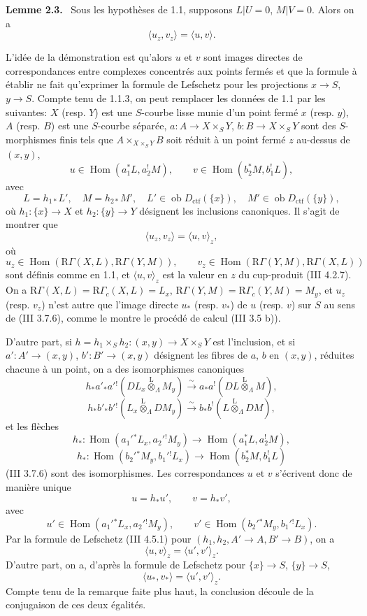 \documentclass[11pt]{article}
\newenvironment{statement}[1]{\par\medskip\noindent\textbf{#1.}\ }{\par\medskip}
\DeclareMathOperator{\Hom}{Hom}
\providecommand{\lten}{\overset{\mathrm L}{\otimes}}
\providecommand{\Ob}{\operatorname{ob}}
\providecommand{\Hom}{\operatorname{Hom}}
\providecommand{\lten}{\overset{\mathrm L}{\otimes}}
\providecommand{\lten}{\overset{\mathrm L}{\otimes}}
\providecommand{\Ob}{\operatorname{ob}}
\providecommand{\lten}{\overset{\mathrm L}{\otimes}}
\providecommand{\lten}{\overset{\mathrm L}{\otimes}}
\providecommand{\Ob}{\operatorname{Ob}}
\providecommand{\lten}{\overset{\mathrm L}{\otimes}}
\begin{document}
\begin{statement}{Lemme 2.3}
Sous les hypothèses de 1.1, supposons $L|U=0$, $M|V=0$. Alors on a
\[
\langle u_z,v_z\rangle=\langle u,v\rangle .
\]
\end{statement}

L'idée de la démonstration est qu'alors $u$ et $v$ sont images directes de correspondances entre complexes concentrés aux points fermés et que la formule à établir ne fait qu'exprimer la formule de Lefschetz pour les projections $x\to S$, $y\to S$. Compte tenu de 1.1.3, on peut remplacer les données de 1.1 par les suivantes: $X$ (resp. $Y$) est une $S$-courbe lisse munie d'un point fermé $x$ (resp. $y$), $A$ (resp. $B$) est une $S$-courbe séparée, $a:A\to X\times_S Y$, $b:B\to X\times_S Y$ sont des $S$-morphismes finis tels que $A\times_{X\times_SY}B$ soit réduit à un point fermé $z$ au-dessus de $(x,y)$,
\[
u\in\Hom(a_1^*L,a_2^!M),\qquad v\in\Hom(b_2^*M,b_1^!L),
\]
avec
\[
L=h_{1*}L',\quad M=h_{2*}M',\quad
L'\in\Ob D_{\mathrm{ctf}}(\{x\}),\quad M'\in\Ob D_{\mathrm{ctf}}(\{y\}),
\]
où $h_1:\{x\}\to X$ et $h_2:\{y\}\to Y$ désignent les inclusions canoniques. Il s'agit de montrer que
\[
\langle u_z,v_z\rangle=\langle u,v\rangle_z,
\]
où
\[
u_z\in\Hom(\mathrm R\Gamma(X,L),\mathrm R\Gamma(Y,M)),\qquad
v_z\in\Hom(\mathrm R\Gamma(Y,M),\mathrm R\Gamma(X,L))
\]
sont définis comme en 1.1, et $\langle u,v\rangle_z$ est la valeur en $z$ du cup-produit (III 4.2.7). On a $\mathrm R\Gamma(X,L)=\mathrm R\Gamma_c(X,L)=L_x$, $\mathrm R\Gamma(Y,M)=\mathrm R\Gamma_c(Y,M)=M_y$, et $u_z$ (resp. $v_z$) n'est autre que l'image directe $u_*$ (resp. $v_*$) de $u$ (resp. $v$) sur $S$ au sens de (III 3.7.6), comme le montre le procédé de calcul (III 3.5 b)).

D'autre part, si $h=h_1\times_Sh_2:(x,y)\to X\times_SY$ est l'inclusion, et si $a':A'\to(x,y)$, $b':B'\to(x,y)$ désignent les fibres de $a$, $b$ en $(x,y)$, réduites chacune à un point, on a des isomorphismes canoniques
\[
h_*a'_*a'{}^!(DL_x\lten_{\Lambda}M_y)
 \xrightarrow{\sim} a_*a^!(DL\lten_{\Lambda}M),
\]
\[
h_*b'_*b'{}^!(L_x\lten_{\Lambda}DM_y)
 \xrightarrow{\sim} b_*b^!(L\lten_{\Lambda}DM),
\]
et les flèches
\[
h_*:\Hom(a_1'{}^*L_x,a_2'{}^!M_y)\to \Hom(a_1^*L,a_2^!M),
\]
\[
h_*:\Hom(b_2'{}^*M_y,b_1'{}^!L_x)\to \Hom(b_2^*M,b_1^!L)
\]
(III 3.7.6) sont des isomorphismes. Les correspondances $u$ et $v$ s'écrivent donc de manière unique
\[
u=h_*u',\qquad v=h_*v',
\]
avec
\[
u'\in\Hom(a_1'{}^*L_x,a_2'{}^!M_y),\qquad
v'\in\Hom(b_2'{}^*M_y,b_1'{}^!L_x).
\]
Par la formule de Lefschetz (III 4.5.1) pour $(h_1,h_2,A'\to A,B'\to B)$, on a
\[
\langle u,v\rangle_z=\langle u',v'\rangle_z .
\]
D'autre part, on a, d'après la formule de Lefschetz pour $\{x\}\to S$, $\{y\}\to S$,
\[
\langle u_*,v_*\rangle=\langle u',v'\rangle_z .
\]
Compte tenu de la remarque faite plus haut, la conclusion découle de la conjugaison de ces deux égalités.
\end{document}
